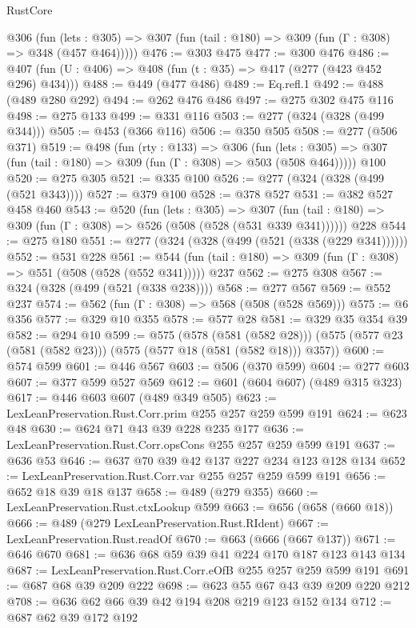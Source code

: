 \begin{lexlean}{RustCore}
\begin{coremodule}
    @306
      (fun (lets : @305) => @307 (fun (tail : @180) => @309 (fun (Γ : @308) => @348 (@457 @464)))))
@476 := @303 @475
@477 := @300 @476
@486 := @407 (fun (U : @406) => @408 (fun (t : @35) => @417 (@277 (@423 @452 @296) @434)))
@488 := @449 (@477 @486)
@489 := Eq.refl.{1}
@492 := @488 (@489 @280 @292)
@494 := @262 @476 @486
@497 := @275 @302 @475 @116
@498 := @275 @133
@499 := @331 @116
@503 := @277 (@324 (@328 (@499 @344)))
@505 := @453 (@366 @116)
@506 := @350 @505
@508 := @277 (@506 @371)
@519 := @498
    (fun (rty : @133) =>
    @306
      (fun (lets : @305) => @307 (fun (tail : @180) => @309 (fun (Γ : @308) => @503 (@508 @464)))))
    @100
@520 := @275 @305
@521 := @335 @100
@526 := @277 (@324 (@328 (@499 (@521 @343))))
@527 := @379 @100
@528 := @378 @527
@531 := @382 @527 @458 @460
@543 := @520
    (fun (lets : @305) =>
    @307 (fun (tail : @180) => @309 (fun (Γ : @308) => @526 (@508 (@528 (@531 @339 @341))))))
    @228
@544 := @275 @180
@551 := @277 (@324 (@328 (@499 (@521 (@338 (@229 @341))))))
@552 := @531 @228
@561 := @544 (fun (tail : @180) => @309 (fun (Γ : @308) => @551 (@508 (@528 (@552 @341))))) @237
@562 := @275 @308
@567 := @324 (@328 (@499 (@521 (@338 @238))))
@568 := @277 @567
@569 := @552 @237
@574 := @562 (fun (Γ : @308) => @568 (@508 (@528 @569)))
@575 := @6 @356
@577 := @329 @10 @355
@578 := @577 @28
@581 := @329 @35 @354 @39
@582 := @294 @10
@599 := @575
    (@578 (@581 (@582 @28)))
    (@575 (@577 @23 (@581 (@582 @23))) (@575 (@577 @18 (@581 (@582 @18))) @357))
@600 := @574 @599
@601 := @446 @567
@603 := @506 (@370 @599)
@604 := @277 @603
@607 := @377 @599 @527 @569
@612 := @601 (@604 @607) (@489 @315 @323)
@617 := @446 @603 @607 (@489 @349 @505)
@623 := LexLeanPreservation.Rust.Corr.prim @255 @257 @259 @599 @191
@624 := @623 @48
@630 := @624 @71 @43 @39 @228 @235 @177
@636 := LexLeanPreservation.Rust.Corr.opsCons @255 @257 @259 @599 @191
@637 := @636 @53
@646 := @637 @70 @39 @42 @137 @227 @234 @123 @128 @134
@652 := LexLeanPreservation.Rust.Corr.var @255 @257 @259 @599 @191
@656 := @652 @18 @39 @18 @137
@658 := @489 (@279 @355)
@660 := LexLeanPreservation.Rust.ctxLookup @599
@663 := @656 (@658 (@660 @18))
@666 := @489 (@279 LexLeanPreservation.Rust.RIdent)
@667 := LexLeanPreservation.Rust.readOf
@670 := @663 (@666 (@667 @137))
@671 := @646 @670
@681 := @636 @68 @59 @39 @41 @224 @170 @187 @123 @143 @134
@687 := LexLeanPreservation.Rust.Corr.eOfB @255 @257 @259 @599 @191
@691 := @687 @68 @39 @209 @222
@698 := @623 @55 @67 @43 @39 @209 @220 @212
@708 := @636 @62 @66 @39 @42 @194 @208 @219 @123 @152 @134
@712 := @687 @62 @39 @172 @192

\end{coremodule}
\end{lexlean}
